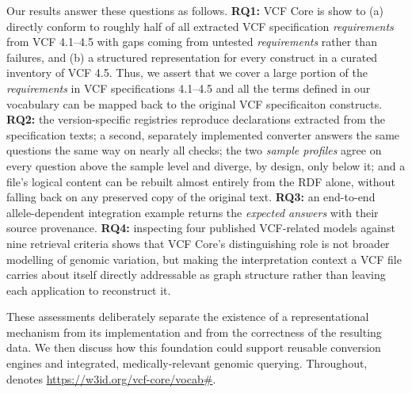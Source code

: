 Our results answer these questions as follows.
\textbf{RQ1:} VCF Core is show to (a) directly conform to roughly half of all extracted VCF specification \emph{requirements} from VCF 4.1--4.5 with gaps coming from untested \emph{requirements} rather than failures, and (b) a structured representation for every construct in a curated inventory of VCF 4.5. Thus, we assert that we cover a large portion of the \emph{requirements} in VCF specifications 4.1--4.5 and all the terms defined in our vocabulary can be mapped back to the original VCF specificaiton constructs.
\textbf{RQ2:} the version-specific registries reproduce declarations extracted from the specification texts; a second, separately implemented converter answers the same questions the same way on nearly all checks; the two \emph{sample profiles} agree on every question above the sample level and diverge, by design, only below it; and a file's logical content can be rebuilt almost entirely from the RDF alone, without falling back on any preserved copy of the original text.
\textbf{RQ3:} an end-to-end allele-dependent integration example returns the \emph{expected answers} with their source provenance.
\textbf{RQ4:} inspecting four published VCF-related models against nine retrieval criteria shows that VCF Core's distinguishing role is not broader modelling of genomic variation, but making the interpretation context a VCF file carries about itself directly addressable as graph structure rather than leaving each application to reconstruct it.

These assessments deliberately separate the existence of a representational mechanism from its implementation and from the correctness of the resulting data.
We then discuss how this foundation could support reusable conversion engines and integrated, medically-relevant genomic querying.
Throughout,  denotes \url{https://w3id.org/vcf-core/vocab#}.



